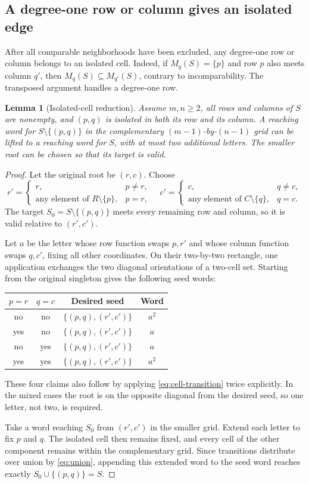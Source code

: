 \documentclass[11pt,letterpaper]{article}
\numberwithin{equation}{section}
\newtheorem{lemma}[theorem]{Lemma}
\theoremstyle{definition}
\theoremstyle{remark}
\begin{document}
\subsection{A degree-one row or column gives an isolated edge}
After all comparable neighborhoods have been excluded, any degree-one row
or column belongs to an isolated cell. Indeed, if $M_q(S)=\{p\}$ and row
$p$ also meets column $q'$, then $M_q(S)\subseteq M_{q'}(S)$, contrary to
incomparability. The transposed argument handles a degree-one row.

\begin{lemma}[Isolated-cell reduction]\label{lem:isolated}
Assume $m,n\ge2$, all rows and columns of $S$ are nonempty, and $(p,q)$ is
isolated in both its row and its column. A reaching word for
$S\setminus\{(p,q)\}$ in the complementary $(m-1)$-by-$(n-1)$ grid can be
lifted to a reaching word for $S$, with at most two additional letters.
The smaller root can be chosen so that its target is valid.
\end{lemma}
\begin{proof}
Let the original root be $(r,c)$. Choose
\[
 r'=\begin{cases}r,&p\ne r,\\ \text{any element of }R\setminus\{p\},&p=r,
 \end{cases}
 \quad
 c'=\begin{cases}c,&q\ne c,\\ \text{any element of }C\setminus\{q\},&q=c.
 \end{cases}
\]
The target $S_0=S\setminus\{(p,q)\}$ meets every remaining row and column,
so it is valid relative to $(r',c')$.

Let $a$ be the letter whose row function swaps $p,r'$ and whose column
function swaps $q,c'$, fixing all other coordinates. On their two-by-two
rectangle, one application exchanges the two diagonal orientations of a
two-cell set. Starting from the original singleton gives the following
seed words:
\begin{center}
\begin{tabular}{cccc}
\toprule
$p=r$ & $q=c$ & Desired seed & Word \\
\midrule
no & no & $\{(p,q),(r',c')\}$ & $a^2$ \\
yes & no & $\{(p,q),(r',c')\}$ & $a$ \\
no & yes & $\{(p,q),(r',c')\}$ & $a$ \\
yes & yes & $\{(p,q),(r',c')\}$ & $a^2$ \\
\bottomrule
\end{tabular}
\end{center}
These four claims also follow by applying \eqref{eq:cell-transition}
twice explicitly. In the mixed cases the root is on the opposite diagonal
from the desired seed, so one letter, not two, is required.

Take a word reaching $S_0$ from $(r',c')$ in the smaller grid. Extend each
letter to fix $p$ and $q$. The isolated cell then remains fixed, and every
cell of the other component remains within the complementary grid. Since
transitions distribute over union by \eqref{eq:union}, appending this extended
word to the
seed word reaches exactly $S_0\cup\{(p,q)\}=S$.
\end{proof}
\end{document}
